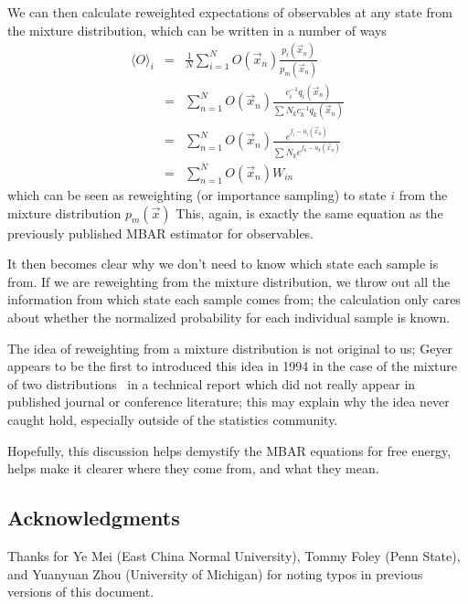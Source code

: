 \documentclass[aps,pre,twocolumn,superscriptaddress]{revtex4-1}
\begin{document}
We can then calculate reweighted expectations of observables at any
state from the mixture distribution, which can be written in a number of ways
\begin{eqnarray}
\langle O \rangle_i  &=& \frac{1}{N}\sum_{i=1}^N O(\vec{x}_n) \frac{p_i(\vec{x}_n)}{p_m(\vec{x}_n)} \nonumber \\
                     &=& \sum_{n=1}^N O(\vec{x}_n) \frac{c_i^{-1} q_i(\vec{x}_n)}{\sum N_k c_k^{-1} q_k(\vec{x}_n)} \nonumber \\ 
                     &=& \sum_{n=1}^N O(\vec{x}_n) \frac{e^{f_i-u_i(\vec{x}_n)}}{\sum N_k e^{f_k - u_k(\vec{x}_n)}} \nonumber \\ 
    &=& \sum_{n=1}^N  O(\vec{x}_n) W_{in} 
\end{eqnarray}
which can be seen as reweighting (or importance sampling) to state $i$
from the mixture distribution $p_m(\vec{x})$ This, again, is exactly
the same equation as the previously published MBAR estimator for
observables.

It then becomes clear why we don't need to know which state each
sample is from. If we are reweighting from the mixture distribution,
we throw out all the information from which state each sample comes
from; the calculation only cares about whether the normalized
probability for each individual sample is known.

The idea of reweighting from a mixture distribution is not original to
us; Geyer appears to be the first to introduced this idea in 1994 in
the case of the mixture of two distributions~\citep{geyer:1994} in a
technical report which did not really appear in published journal or
conference literature; this may explain why the idea never caught
hold, especially outside of the statistics community.

Hopefully, this discussion helps demystify the MBAR equations for free
energy, helps make it clearer where they come from, and what they
mean.

\subsection*{Acknowledgments}

Thanks for Ye Mei (East China Normal University), Tommy Foley (Penn
State), and Yuanyuan Zhou (University of Michigan) for noting typos in
previous versions of this document.



\end{document}
